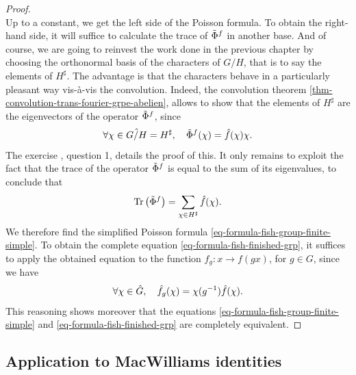\begin{proof}
\begin{equation*}
\end{equation*}
Up to a constant, we get the left side of the Poisson formula. To obtain the right-hand side, it will suffice to calculate the trace of $ \tilde{\Phi}^f $ in another base. And of course, we are going to reinvest the work done in the previous chapter by choosing the orthonormal basis of the characters of $ G / H $, that is to say the elements of $ H^{\sharp} $. The advantage is that the characters behave in a particularly pleasant way vis-à-vis the convolution. Indeed, the convolution theorem \ref{thm-convolution-trans-fourier-grpe-abelien}, allows to show that the elements of $ H^\sharp $ are the eigenvectors of the operator $ \tilde{\Phi }^f $, since
\begin{equation*}
\forall \chi \in \hat{G / H} = H^{\sharp}, \quad \tilde{\Phi}^f(\chi) = \hat{f} (\chi) \chi.
\end{equation*}
The exercise , question 1, details the proof of this. It only remains to exploit the fact that the trace of the operator $ \tilde{\Phi}^f $ is equal to the sum of its eigenvalues, to conclude that
\begin{equation*}
\operatorname{Tr} \left(\tilde{\Phi}^f \right) = \sum_{\chi \in H^{\sharp}}{\hat{f} (\chi)}.
\end{equation*}
We therefore find the simplified Poisson formula \eqref{eq-formula-fish-group-finite-simple}. To obtain the complete equation \eqref{eq-formula-fish-finished-grp}, it suffices to apply the obtained equation to the function $ f_g: x \rightarrow f(gx) $, for $ g \in G $, since we have
\begin{equation*}
\forall \chi \in \hat{G}, \quad \hat{f_g} (\chi) = \chi (g^{-1}) \hat{f} (\chi).
\end{equation*}
This reasoning shows moreover that the equations \eqref{eq-formula-fish-group-finite-simple} and \eqref{eq-formula-fish-finished-grp} are completely equivalent.
\end{proof}
 
\subsection{Application to MacWilliams identities}
\label{sect2-application-id-mac-williams} 
 
